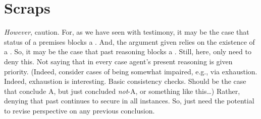 \section{Scraps}
\label{sec:scraps}

\begin{note}
  \emph{However}, caution.
  For, as we have seen with testimony, it may be the case that status of a premises blocks a \requ{}.
  And, the argument given relies on the existence of a \requ{}.
  So, it may be the case that past reasoning blocks a \requ{}.
  Still, here, only need to deny this.
  Not saying that in every case agent's present reasoning is given priority.
  (Indeed, consider cases of being somewhat impaired, e.g., via exhaustion.
  Indeed, exhaustion is interesting.
  Basic consistency checks.
  Should be the case that conclude A, but just concluded \emph{not}-A, or something like this\dots)
  Rather, denying that past continues to secure in all instances.
  So, just need the potential to revise perspective on any previous conclusion.
\end{note}



